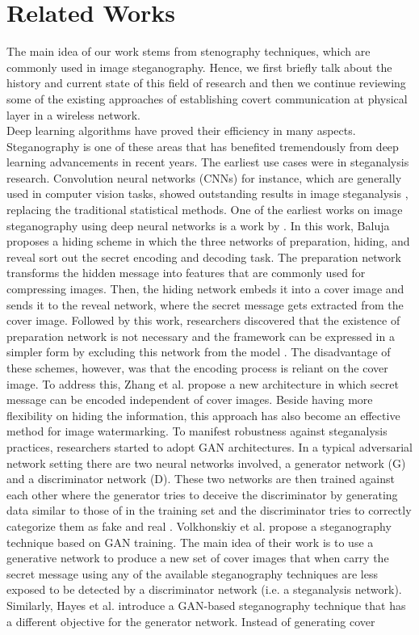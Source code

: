 \section{Related Works}
\label{s:related}
The main idea of our work stems from stenography techniques, which are commonly used in image steganography. Hence, we first briefly talk about the history and current state of this field of research and then we continue reviewing some of the existing approaches of establishing covert communication at physical layer in a wireless network.\\
Deep learning algorithms have proved their efficiency in many aspects. Steganography is one of these areas that has benefited tremendously from deep learning advancements in recent years. The earliest use cases were in steganalysis research. Convolution neural networks (CNNs) for instance, which are generally used in computer vision tasks, showed outstanding results in image steganalysis \cite{tan2014stacked,qian2015deep,xu2016structural}, replacing the traditional statistical methods. One of the earliest works on image steganography using deep neural networks is a work by \cite{baluja2017hiding}. In this work, Baluja proposes a hiding scheme in which the three networks of preparation, hiding, and reveal sort out the secret encoding and decoding task. The preparation network transforms the hidden message into features that are commonly used for compressing images. Then, the hiding network embeds it into a cover image and sends it to the reveal network, where the secret message gets extracted from the cover image. Followed by this work, researchers discovered that the existence of preparation network is not necessary and the framework can be expressed in a simpler form by excluding this network from the model \cite{zhang2021brief}. The disadvantage of these schemes, however, was that the encoding process is reliant on the cover image. To address this, Zhang et al. \cite{zhang2020udh} propose a new architecture in which secret message can be encoded independent of cover images. Beside having more flexibility on hiding the information, this approach has also become an effective method for image watermarking. To manifest robustness against steganalysis practices, researchers started to adopt GAN architectures. In a typical adversarial network setting there are two neural networks involved, a generator network (G) and a discriminator network (D). These two networks are then trained against each other where the generator tries to deceive the discriminator by generating data similar to those of in the training set and the discriminator tries to correctly categorize them as fake and real \cite{goodfellow2014generative}. Volkhonskiy et al. \cite{volkhonskiy2020steganographic} propose a steganography technique based on GAN training. The main idea of their work is to use a generative network to produce a new set of cover images that when carry the secret message using any of the available steganography techniques are less exposed to be detected by a discriminator network (i.e. a steganalysis network). Similarly, Hayes et al. \cite{hayes2017generating} introduce a GAN-based steganography technique that has a different objective for the generator network. Instead of generating cover 